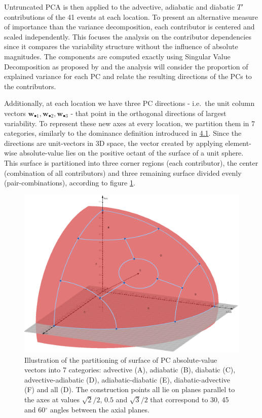 \documentclass[11pt,a4paper,twoside,openright]{report}
\theoremstyle{definition}
\begin{document}
Untruncated PCA is then applied to the advective, adiabatic and diabatic \(T'\) contributions of the 41 events at each location. To present an alternative measure of importance than the variance decomposition, each contributor is centered and scaled independently. This focuses the analysis on the contributor dependencies since it compares the variability structure without the influence of absolute magnitudes. The components are computed exactly using Singular Value Decomposition as proposed by \cite{halko_finding_2011} and the analysis will consider the proportion of explained variance for each PC and relate the resulting directions of the PCs to the contributors.

Additionally, at each location we have three PC directions - i.e.~the unit column vectors \(\mathbf{w}_{\bullet 1}, \mathbf{w}_{\bullet 2},  \mathbf{w}_{\bullet 3}\) - that point in the orthogonal directions of largest variability. To represent these new axes at every location, we partition them in 7 categories, similarly to the dominance definition introduced in \hyperref[variance-decomposition-of-tx1day-t]{4.1}. Since the directions are unit-vectors in 3D space, the vector created by applying element-wise absolute-value lies on the positive octant of the surface of a unit sphere. This surface is partitioned into three corner regions (each contributor), the center (combination of all contributors) and three remaining surface divided evenly (pair-combinations), according to figure \ref{fig:pcascores}.

\begin{figure}[h]

{\centering \includegraphics[width=0.8\linewidth]{images/pca_partition} 

}

\caption{Illustration of the partitioning of surface of PC absolute-value vectors into 7 categories: advective (A), adiabatic (B), diabatic (C), advective-adiabatic (D), adiabatic-diabatic (E), diabatic-advective (F) and all (D). The construction points all lie on planes parallel to the axes at values $\sqrt{2}/2$, $0.5$ and $\sqrt{3}/2$ that correspond to 30, 45 and 60$^\circ$ angles between the axial planes.}\label{fig:pcascores}
\end{figure}
\end{document}
